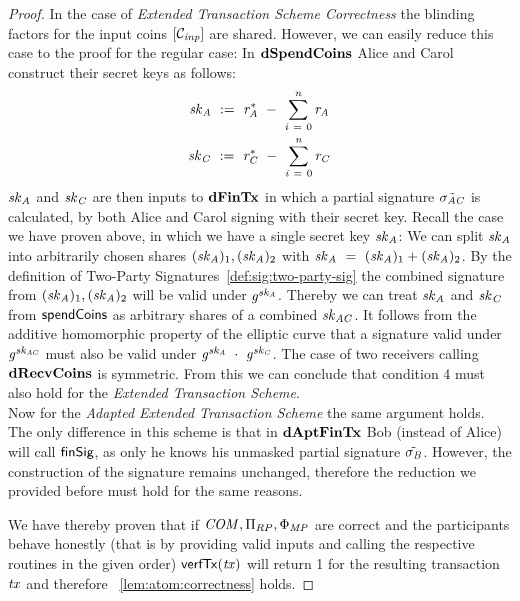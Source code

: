\begin{proof}
    In the case of \emph{Extended Transaction Scheme Correctness} the blinding factors for the input coins $[\mathcal{C}_{\mathit{inp}}]$ are shared.
    However, we can easily reduce this case to the proof for the regular case:
    In $\mathbf{dSpendCoins}$ Alice and Carol construct their secret keys as follows:
    \begin{gather}
        \mathit{sk}_{\mathit{A}} ~:=~ \mathit{r}_{\mathit{A}}^* ~-~ \sum_{\mathit{i} ~=~ 0}^{\mathit{n}} \mathit{r}_{\mathit{A}} \\
        \mathit{sk}_{\mathit{C}} ~:=~ \mathit{r}_{\mathit{C}}^* ~-~ \sum_{\mathit{i} ~=~ 0}^{\mathit{n}} \mathit{r}_{\mathit{C}}
    \end{gather}
    $\mathit{sk}_{\mathit{A}}$ and $\mathit{sk}_{\mathit{C}}$ are then inputs to $\mathbf{dFinTx}$ in which a partial signature $\tilde{\sigma_{\mathit{A}\mathit{C}}}$ is calculated, by both Alice and Carol signing with their secret key.
    Recall the case we have proven above, in which we have a single secret key $\mathit{sk}_{\mathit{A}}$:
    We can split $\mathit{sk}_{\mathit{A}}$ into arbitrarily chosen shares $(\mathit{sk}_{\mathit{A}})_1, (\mathit{sk}_{\mathit{A}})_2$ with $\mathit{sk}_{\mathit{A}} ~=~ (\mathit{sk}_{\mathit{A}})_1 + (\mathit{sk}_{\mathit{A}})_2$.
    By the definition of Two-Party Signatures~\cref{def:sig:two-party-sig} the combined signature from $(\mathit{sk}_{\mathit{A}})_1, (\mathit{sk}_{\mathit{A}})_2$ will be valid under $\mathit{g}^{\mathit{sk}_{\mathit{A}}}$.
    Thereby we can treat $\mathit{sk}_{\mathit{A}}$ and $\mathit{sk}_{\mathit{C}}$ from $\mathsf{spendCoins}$ as arbitrary shares of a combined $\mathit{sk}_{\mathit{A}\mathit{C}}$.
    It follows from the additive homomorphic property of the elliptic curve that a signature valid under $\mathit{g}^{\mathit{sk}_{\mathit{A}\mathit{C}}}$ must also be valid under $\mathit{g}^{\mathit{sk}_{\mathit{A}}} ~\cdot~ \mathit{g}^{\mathit{sk}_{\mathit{C}}}$.
    The case of two receivers calling $\mathbf{dRecvCoins}$ is symmetric.
    From this we can conclude that condition 4 must also hold for the \emph{Extended Transaction Scheme}. \\
    Now for the \emph{Adapted Extended Transaction Scheme} the same argument holds.
    The only difference in this scheme is that in $\mathbf{dAptFinTx}$ Bob (instead of Alice) will call $\mathsf{finSig}$, as only he knows his unmasked partial signature $\tilde{\sigma_{\mathit{B}}}$.
    However, the construction of the signature remains unchanged, therefore the reduction we provided before must hold for the same reasons.

    We have thereby proven that if $\mathit{COM}, \Pi_{RP}, \Phi_{\mathit{MP}}$ are correct and the participants behave honestly (that is by providing valid inputs and calling the respective routines in the given order) $\mathsf{verfTx}(\mathit{tx})$ will return 1 for the resulting transaction $\mathit{tx}$ and therefore ~\cref{lem:atom:correctness} holds.
\end{proof}

